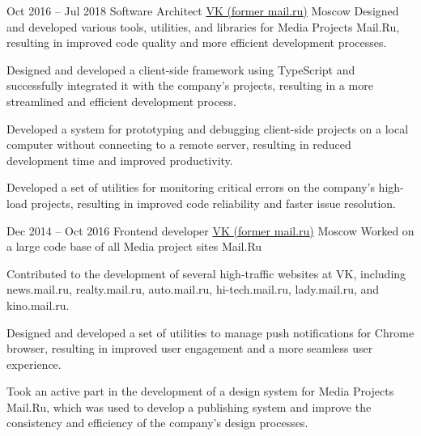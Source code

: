 \cventry
  {Oct 2016 – Jul 2018}
  {Software Architect}
  {\href{https://vk.company}{VK ({former mail.ru})}}
  {Moscow}
  {}
  {Designed and developed various tools, utilities, and libraries for Media Projects Mail.Ru, resulting in improved code quality and more efficient development processes.}

\cvlistitem
  {Designed and developed a client-side framework using TypeScript and successfully integrated it with the company's projects, resulting in a more streamlined and efficient development process.}

\cvlistitem
  {Developed a system for prototyping and debugging client-side projects on a local computer without connecting to a remote server, resulting in reduced development time and improved productivity.}

\cvlistitem
  {Developed a set of utilities for monitoring critical errors on the company's high-load projects, resulting in improved code reliability and faster issue resolution.}


\cvline{}{}

\cventry
  {Dec 2014 – Oct 2016}
  {Frontend developer}
  {\href{https://vk.company}{VK ({former mail.ru})}}
  {Moscow}
  {}
  {Worked on a large code base of all Media project sites Mail.Ru}

\cvlistitem
  {Contributed to the development of several high-traffic websites at VK, including news.mail.ru, realty.mail.ru, auto.mail.ru, hi-tech.mail.ru, lady.mail.ru, and kino.mail.ru.}

\cvlistitem
  {Designed and developed a set of utilities to manage push notifications for Chrome browser, resulting in improved user engagement and a more seamless user experience.}

\cvlistitem
  {Took an active part in the development of a design system for Media Projects Mail.Ru, which was used to develop a publishing system and improve the consistency and efficiency of the company's design processes.}
